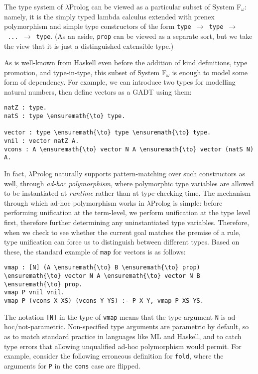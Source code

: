 The type system of \ensuremath{\lambda}Prolog can be viewed as a particular subset of
System F\(_\ensuremath{\omega}\): namely, it is the simply typed lambda calculus extended
with prenex polymorphism and simple type constructors of the form
\texttt{type\ \ensuremath{\to}\ type\ \ensuremath{\to}\ ...\ \ensuremath{\to}\ type}.
(As an aside, \texttt{prop} can be viewed as a separate sort, but we
take the view that it is just a distinguished extensible type.)

As is well-known from Haskell even before the addition of kind
definitions, type promotion, and type-in-type, this subset of System
F\(_\ensuremath{\omega}\) is enough to model some form of dependency. For example, we can
introduce two types for modelling natural numbers, then define vectors
as a GADT using them:

\begin{verbatim}
natZ : type.
natS : type \ensuremath{\to} type.

vector : type \ensuremath{\to} type \ensuremath{\to} type.
vnil : vector natZ A.
vcons : A \ensuremath{\to} vector N A \ensuremath{\to} vector (natS N) A.
\end{verbatim}

In fact, \ensuremath{\lambda}Prolog naturally supports pattern-matching over such
constructors as well, through \emph{ad-hoc polymorphism}, where
polymorphic type variables are allowed to be instantiated at
\emph{runtime} rather than at type-checking time. The mechanism through
which ad-hoc polymorphism works in \ensuremath{\lambda}Prolog is simple: before performing
unification at the term-level, we perform unification at the type level
first, therefore further determining any uninstantiated type variables.
Therefore, when we check to see whether the current goal matches the
premise of a rule, type unification can force us to distinguish between
different types. Based on these, the standard example of \texttt{map}
for vectors is as follows:

\begin{verbatim}
vmap : [N] (A \ensuremath{\to} B \ensuremath{\to} prop) \ensuremath{\to} vector N A \ensuremath{\to} vector N B \ensuremath{\to} prop.
vmap P vnil vnil.
vmap P (vcons X XS) (vcons Y YS) :- P X Y, vmap P XS YS.
\end{verbatim}

The notation \texttt{{[}N{]}} in the type of \texttt{vmap} means that
the type argument \texttt{N} is ad-hoc/not-parametric. Non-specified
type arguments are parametric by default, so as to match standard
practice in languages like ML and Haskell, and to catch type errors that
allowing unqualified ad-hoc polymorphism would permit. For example,
consider the following erroneous definition for \texttt{fold}, where the
arguments for \texttt{P} in the \texttt{cons} case are flipped.


